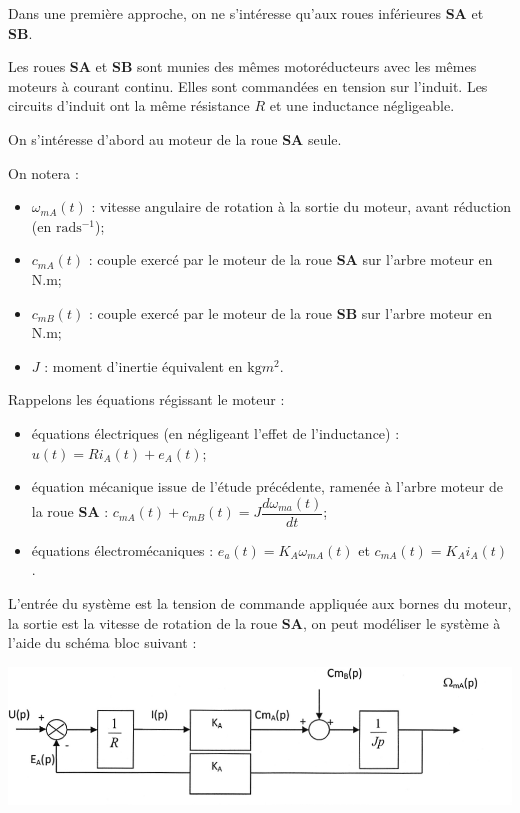 \documentclass[10pt,fleqn]{article} %
\begin{document}
Dans une première approche, on ne s’intéresse qu’aux roues inférieures \textbf{SA} et \textbf{SB}.

Les roues \textbf{SA} et \textbf{SB} sont munies des mêmes motoréducteurs avec les mêmes moteurs à courant continu.
Elles sont commandées en tension sur l’induit. Les circuits d’induit ont la même résistance $R$ et une inductance négligeable.

On s’intéresse d’abord au moteur de la roue \textbf{SA} seule.

On notera :
\begin{itemize}
\item $\omega_{mA}(t)$ : vitesse angulaire de rotation à la sortie du moteur, avant réduction (en $\text{rad}\text{s}^{-1}$);
\item $c_{mA}(t)$ : couple exercé par le moteur de la roue \textbf{SA} sur l’arbre moteur en N.m;
\item $c_{mB}(t)$ : couple exercé par le moteur de la roue \textbf{SB} sur l’arbre moteur en N.m;
\item $J$ : moment d’inertie équivalent en $\text{kg}{m}^2$.
\end{itemize}
Rappelons les équations régissant le moteur : 
\begin{itemize}
\item équations électriques (en négligeant l’effet de l’inductance) : $u(t)=Ri_A(t)+e_A(t)$;
\item équation mécanique issue de l’étude précédente, ramenée à l’arbre moteur de la roue \textbf{SA} : $c_{mA}(t)+c_{mB}(t)=J\dfrac{d\omega_{ma}(t)}{dt}$;
\item équations électromécaniques : $e_a(t)=K_A\omega_{mA}(t)$ et $c_{mA}(t)=K_Ai_A(t)$.
 \end{itemize}
 
L’entrée du système est la tension de commande appliquée aux bornes du moteur, la sortie est la vitesse de rotation de la roue \textbf{SA}, on peut modéliser le système à l’aide du schéma bloc suivant :
\begin{center}
	\includegraphics[width=\linewidth]{images/fig_10}
\end{center}
\end{document}
